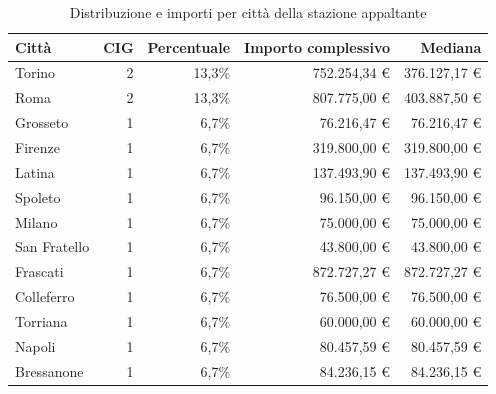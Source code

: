 \begin{table}[htbp]
\centering
\small
\caption{Distribuzione e importi per città della stazione appaltante}
\begin{tabular}{lrrrr}
\toprule
Città & CIG & Percentuale & Importo complessivo & Mediana \\
\midrule
Torino & 2 & 13,3\% & 752.254,34 € & 376.127,17 € \\
Roma & 2 & 13,3\% & 807.775,00 € & 403.887,50 € \\
Grosseto & 1 & 6,7\% & 76.216,47 € & 76.216,47 € \\
Firenze & 1 & 6,7\% & 319.800,00 € & 319.800,00 € \\
Latina & 1 & 6,7\% & 137.493,90 € & 137.493,90 € \\
Spoleto & 1 & 6,7\% & 96.150,00 € & 96.150,00 € \\
Milano & 1 & 6,7\% & 75.000,00 € & 75.000,00 € \\
San Fratello & 1 & 6,7\% & 43.800,00 € & 43.800,00 € \\
Frascati & 1 & 6,7\% & 872.727,27 € & 872.727,27 € \\
Colleferro & 1 & 6,7\% & 76.500,00 € & 76.500,00 € \\
Torriana & 1 & 6,7\% & 60.000,00 € & 60.000,00 € \\
Napoli & 1 & 6,7\% & 80.457,59 € & 80.457,59 € \\
Bressanone & 1 & 6,7\% & 84.236,15 € & 84.236,15 € \\
\bottomrule
\end{tabular}
\end{table}
